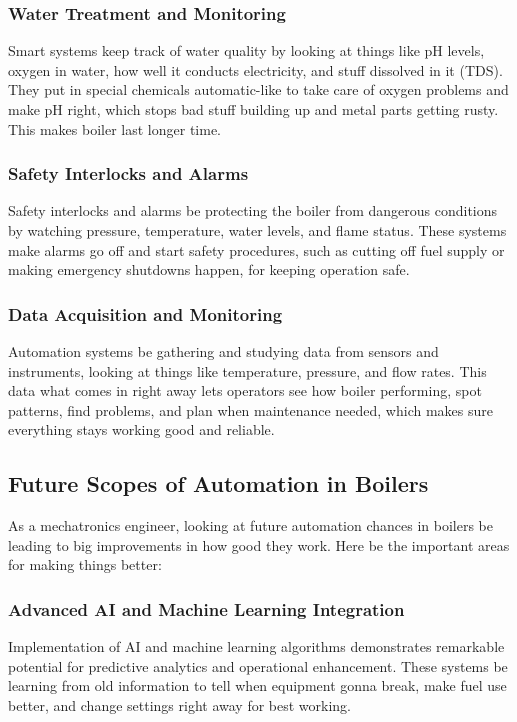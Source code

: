 \subsubsection{Water Treatment and Monitoring}
Smart systems keep track of water quality by looking at things like pH levels, oxygen in water, how well it conducts electricity, and stuff dissolved in it (TDS). They put in special chemicals automatic-like to take care of oxygen problems and make pH right, which stops bad stuff building up and metal parts getting rusty. This makes boiler last longer time.

\subsubsection{Safety Interlocks and Alarms}
Safety interlocks and alarms be protecting the boiler from dangerous conditions by watching pressure, temperature, water levels, and flame status. These systems make alarms go off and start safety procedures, such as cutting off fuel supply or making emergency shutdowns happen, for keeping operation safe.

\subsubsection{Data Acquisition and Monitoring}
Automation systems be gathering and studying data from sensors and instruments, looking at things like temperature, pressure, and flow rates. This data what comes in right away lets operators see how boiler performing, spot patterns, find problems, and plan when maintenance needed, which makes sure everything stays working good and reliable.

\subsection{Future Scopes of Automation in Boilers}
As a mechatronics engineer, looking at future automation chances in boilers be leading to big improvements in how good they work. Here be the important areas for making things better:

\subsubsection{Advanced AI and Machine Learning Integration}
Implementation of AI and machine learning algorithms demonstrates remarkable potential for predictive analytics and operational enhancement. These systems be learning from old information to tell when equipment gonna break, make fuel use better, and change settings right away for best working.

